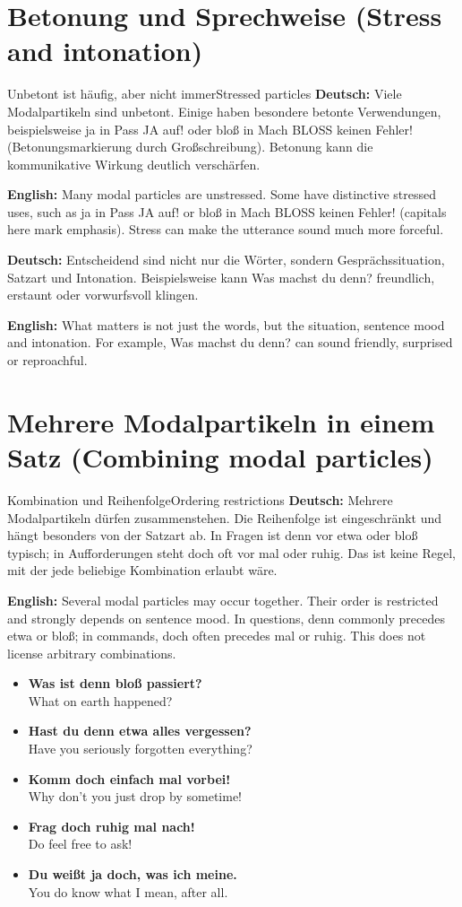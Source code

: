 \documentclass[a4paper,11pt]{article}
\newcommand{\GermanText}[1]{\textbf{Deutsch: }#1\par}
\newcommand{\EnglishText}[1]{{\small\color{SoftGray}\textbf{English: }#1\par}}
\newcommand{\ExampleItem}[2]{\item \textbf{#1}\\{\small\color{SoftGray}#2}}
\begin{document}
\section{Betonung und Sprechweise \textnormal{(Stress and intonation)}}
\begin{grammarentry}{Unbetont ist häufig, aber nicht immer}{Stressed particles}
\GermanText{Viele Modalpartikeln sind unbetont. Einige haben besondere betonte Verwendungen, beispielsweise ja in Pass JA auf! oder bloß in Mach BLOSS keinen Fehler! (Betonungsmarkierung durch Großschreibung). Betonung kann die kommunikative Wirkung deutlich verschärfen.}
\EnglishText{Many modal particles are unstressed. Some have distinctive stressed uses, such as ja in Pass JA auf! or bloß in Mach BLOSS keinen Fehler! (capitals here mark emphasis). Stress can make the utterance sound much more forceful.}
\end{grammarentry}
\GermanText{Entscheidend sind nicht nur die Wörter, sondern Gesprächssituation, Satzart und Intonation. Beispielsweise kann Was machst du denn? freundlich, erstaunt oder vorwurfsvoll klingen.}
\EnglishText{What matters is not just the words, but the situation, sentence mood and intonation. For example, Was machst du denn? can sound friendly, surprised or reproachful.}
\section{Mehrere Modalpartikeln in einem Satz \textnormal{(Combining modal particles)}}
\begin{grammarentry}{Kombination und Reihenfolge}{Ordering restrictions}
\GermanText{Mehrere Modalpartikeln dürfen zusammenstehen. Die Reihenfolge ist eingeschränkt und hängt besonders von der Satzart ab. In Fragen ist denn vor etwa oder bloß typisch; in Aufforderungen steht doch oft vor mal oder ruhig. Das ist keine Regel, mit der jede beliebige Kombination erlaubt wäre.}
\EnglishText{Several modal particles may occur together. Their order is restricted and strongly depends on sentence mood. In questions, denn commonly precedes etwa or bloß; in commands, doch often precedes mal or ruhig. This does not license arbitrary combinations.}
\end{grammarentry}
\begin{exbox}\begin{itemize}
\ExampleItem{Was ist denn bloß passiert?}{What on earth happened?}
\ExampleItem{Hast du denn etwa alles vergessen?}{Have you seriously forgotten everything?}
\ExampleItem{Komm doch einfach mal vorbei!}{Why don't you just drop by sometime!}
\ExampleItem{Frag doch ruhig mal nach!}{Do feel free to ask!}
\ExampleItem{Du weißt ja doch, was ich meine.}{You do know what I mean, after all.}
\end{itemize}\end{exbox}
\end{document}
